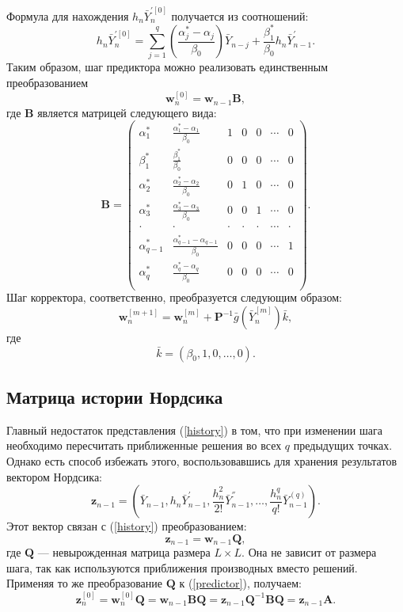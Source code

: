 \documentclass[oneside,final,14pt]{extreport}
\begin{document}
Формула для нахождения \(h_n\bar Y_{n}^{'[0]}\) получается из соотношений:
\[
h_n\bar Y_{n}^{'[0]}=\sum_{j=1}^q\left(\frac{\alpha_j^*-\alpha_j}{\beta_0}\right)\bar Y_{n-j}+\frac{\beta_1^*}{\beta_0}h_n\bar Y_{n-1}^{'}.
\]
Таким образом, шаг предиктора можно реализовать единственным преобразованием
\begin{equation}
\label{predictor}
\mathbf w_n^{[0]}=\mathbf w_{n-1} \mathbf B ,\end{equation}
где \(\mathbf B\) является матрицей следующего вида:
\begin{equation}
\label{B}
\mathbf{B}=
\begin{pmatrix}
\alpha_1^* & \frac{\alpha_1^*-\alpha_1}{\beta_0} & 1 & 0 & 0 & \cdots & 0\\
\beta_1^* & \frac{\beta_1^*}{\beta_0} & 0 & 0 & 0 & \cdots & 0\\
\alpha_2^* & \frac{\alpha_2^*-\alpha_2}{\beta_0} & 0 & 1 & 0 & \cdots & 0\\
\alpha_3^* & \frac{\alpha_3^*-\alpha_3}{\beta_0} & 0 & 0 & 1 & \cdots & 0\\
\cdot & \cdot & \cdot & \cdot & \cdot & \cdots & \cdot \\
\alpha_{q-1}^* & \frac{\alpha_{q-1}^*-\alpha_{q-1}}{\beta_0} & 0 & 0 & 0 & \cdots & 1\\
\alpha_q^* & \frac{\alpha_q^*-\alpha_q}{\beta_0} & 0 & 0 & 0 & \cdots & 0\\
\end{pmatrix}.
\end{equation}
Шаг корректора, соответственно, преобразуется следующим образом: 
\begin{equation}
\label{corrector}
\mathbf w_n^{[m+1]}=\mathbf w_n^{[m]}+\mathbf P^{-1}\bar g(\bar Y_n^{[m]})\bar k,
\end{equation}
где
\[\bar k=(\beta_0, 1,0,\ldots,0).\]

\subsection{Матрица истории Нордсика}
Главный недостаток представления (\ref{history}) в том, что при изменении шага необходимо пересчитать приближенные решения во всех \(q\) предыдущих точках. Однако есть способ избежать этого, воспользовавшись для хранения результатов вектором Нордсика:
\[\mathbf z_{n-1}=\left(\bar Y_{n-1},h_n\bar Y_{n-1}^{'}, \frac{h_n^2}{2!}\bar Y_{n-1}^{''},\ldots,\frac{h_n^q}{q!}\bar Y_{n-1}^{(q)}\right).\]
Этот вектор связан с (\ref{history}) преобразованием:
\[\mathbf z_{n-1}=\mathbf w_{n-1} \mathbf Q,\]
где \(\mathbf Q\) --- невырожденная матрица размера \(L \times L\). Она не зависит от размера шага, так как используются приближения производных вместо решений. Применяя то же преобразование \(\mathbf Q\) к (\ref{predictor}), получаем:
\[
\mathbf z_n^{[0]}=\mathbf w_n^{[0]}\mathbf Q=\mathbf w_{n-1}\mathbf{B Q}=\mathbf z_{n-1}\mathbf Q^{-1}\mathbf{B Q}=\mathbf z_{n-1}\mathbf A
.\]
\end{document}

